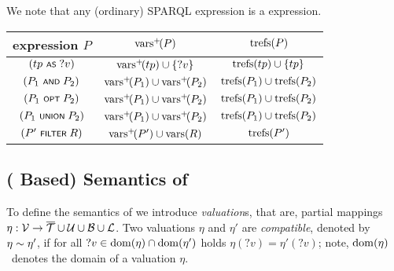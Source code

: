 \begin{note}
		We note that any
	(ordinary) SPARQL expression is a {\SPARQLplus} expression.
\end{note}



	\begin{tabular}{|c||c|c|} \hline
		{\SPARQLplus} expression $P$ &
		$\mathrm{vars}^+\!(P)$ &
		$\mathrm{trefs}(P)$
		\\ \hline
		\hline
		$(tp \text{ \normalfont\scriptsize\textsf{AS} } ?v)$ &
		$\mathrm{vars}^+\!(tp) \cup \lbrace ?v \rbrace$ &
		$\mathrm{trefs}(tp) \cup \lbrace tp \rbrace$
		\\ \hline
		$(P_1 \text{ \normalfont\scriptsize\textsf{AND} } P_2)$ &
		$\mathrm{vars}^+\!(P_1) \cup \mathrm{vars}^+\!(P_2)$ &
		$\mathrm{trefs}(P_1) \cup \mathrm{trefs}(P_2)$
		\\ \hline
		$(P_1 \text{ \normalfont\scriptsize\textsf{OPT} } P_2)$ &
		$\mathrm{vars}^+\!(P_1) \cup \mathrm{vars}^+\!(P_2)$ &
		$\mathrm{trefs}(P_1) \cup \mathrm{trefs}(P_2)$
		\\ \hline
		$(P_1 \text{ \normalfont\scriptsize\textsf{UNION} } P_2)$ &
		$\mathrm{vars}^+\!(P_1) \cup \mathrm{vars}^+\!(P_2)$ &
		$\mathrm{trefs}(P_1) \cup \mathrm{trefs}(P_2)$
		\\ \hline
		$(P' \text{ \normalfont\scriptsize\textsf{FILTER} } R)$ &
		$\mathrm{vars}^+\!(P') \cup \mathrm{vars}(R)$ &
		$\mathrm{trefs}(P')$
		\\ \hline
	\end{tabular}



\subsection{({\RDFplus} Based) Semantics of {\SPARQLplus}}
	To define the semantics of {\SPARQLplus} we introduce
\emph{valuation}s, that are, partial mappings $\eta : \mathcal{V} \rightarrow \overline{\mathcal{T}} \cup \mathcal{U} \cup \mathcal{B} \cup \mathcal{L}$.
Two valuations $\eta$ and $\eta'$ are \emph{compatible}, denoted by $\eta \sim \eta'$, if for all $?v \in \mathrm{dom}(\eta) \cap \mathrm{dom}(\eta')$ holds $\eta(?v) = \eta'(?v)$; note,
	$\mathrm{dom}(\eta)$~denotes %
the domain of a valuation $\eta$.

